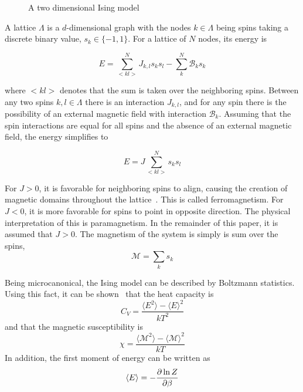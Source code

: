 \documentclass[aps,reprint]{revtex4-1}
\newcommand{\mean}[1]{\langle #1 \rangle}
\begin{document}
\begin{figure}[H]
  \centering
  \caption{A two dimensional Ising model}
  \label{fig:22lattice}
\end{figure}
A lattice \(\Lambda\) is a \(d\)-dimensional graph with the nodes \(k\in\Lambda\) being spins
taking a discrete binary value, \(s_{k}\in\{-1, 1\}\). For a lattice of \(N\)
nodes, its energy is

\begin{equation}
  \label{eq:2}
 E = \sum_{<kl>}^{N}J_{k,l}s_{k}s_{l} - \sum_{k}^{N}\mathcal{B}_{k}s_{k}
\end{equation}

where \(<kl>\) denotes that the sum is taken over the neighboring spins.
Between any two spins \(k, l \in \Lambda\) there is an interaction \(J_{k,l}\),
and for any spin there is the possibility of an external magnetic field with
interaction \(\mathcal{B}_{k}\). Assuming that the spin interactions are equal
for all spins and the absence of an external magnetic field, the energy
simplifies to

\begin{equation}
  \label{eq:3}
  E = J\sum_{<kl>}^{N}s_{k}s_{l}
\end{equation}

For \(J>0\), it is favorable for neighboring spins to align, causing the
creation of magnetic domains throughout the lattice~\cite{physicslectures}.
This is called ferromagnetism. For \(J<0\), it is more favorable for spins to
point in opposite direction. The physical interpretation of this is
paramagnetism. In the remainder of this paper, it is assumed that \(J>0\).
The magnetism of the system is simply is sum over the spins,
\begin{equation}
  \label{eq:1}
  \mathcal{M} = \sum_{k} s_{k}
\end{equation}

Being microcanonical, the Ising model can be described by Boltzmann statistics.
Using this fact, it can be shown~\cite{physicslectures} that the heat capacity is
\begin{equation}
  \label{eq:4}
  C_V = \frac{\mean{E^2} - \mean{E}^2}{kT^2}
\end{equation}
and that the magnetic susceptibility is
\begin{equation}
  \label{eq:5}
  \chi = \frac{\mean{\mathcal{M}^2} - \mean{\mathcal{M}}^2}{kT}
\end{equation}
In addition, the first moment of energy can be written as
\begin{equation}
  \label{eq:6}
  \mean{E} = - \pdv{\ln{Z}}{\beta}
\end{equation}
\end{document}
